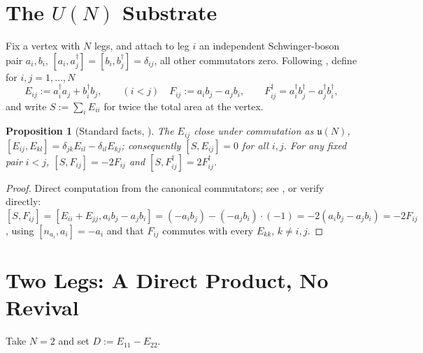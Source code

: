 \documentclass[11pt]{amsart}
\newtheorem{proposition}[theorem]{Proposition}
\theoremstyle{remark}
\begin{document}
\section{The $U(N)$ Substrate}

Fix a vertex with $N$ legs, and attach to leg $i$ an independent Schwinger-boson pair $a_i,b_i$, $[a_i,a_j^\dagger]=[b_i,b_j^\dagger]=\delta_{ij}$, all other commutators zero. Following \cite{BorjaEtal,FreidelLivine}, define for $i,j=1,\dots,N$
\[
E_{ij}:=a_i^\dagger a_j+b_i^\dagger b_j,\qquad (i<j)\quad F_{ij}:=a_ib_j-a_jb_i,\qquad F_{ij}^\dagger = a_i^\dagger b_j^\dagger - a_j^\dagger b_i^\dagger,
\]
and write $S:=\sum_i E_{ii}$ for twice the total area at the vertex.

\begin{proposition}[Standard facts, \cite{BorjaEtal}]\label{prop:standard}
The $E_{ij}$ close under commutation as $\mathfrak u(N)$, $[E_{ij},E_{kl}]=\delta_{jk}E_{il}-\delta_{il}E_{kj}$; consequently $[S,E_{ij}]=0$ for all $i,j$. For any fixed pair $i<j$, $[S,F_{ij}]=-2F_{ij}$ and $[S,F_{ij}^\dagger]=2F_{ij}^\dagger$.
\end{proposition}
\begin{proof}
Direct computation from the canonical commutators; see \cite{BorjaEtal}, or verify directly: $[S,F_{ij}]=[E_{ii}+E_{jj},a_ib_j-a_jb_i]=(-a_ib_j)-(-a_jb_i)\cdot(-1)=-2(a_ib_j-a_jb_i)=-2F_{ij}$, using $[n_{a_i},a_i]=-a_i$ and that $F_{ij}$ commutes with every $E_{kk}$, $k\neq i,j$.
\end{proof}

\section{Two Legs: A Direct Product, No Revival}\label{sec:two-legs}

Take $N=2$ and set $D:=E_{11}-E_{22}$.
\end{document}
